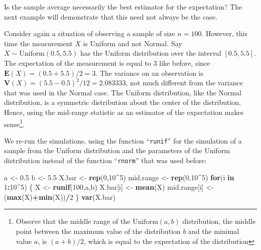 \documentclass[]{krantz}
\makeatletter
\newenvironment{Shaded}{\begin{snugshade}}{\end{snugshade}}
\newcommand{\ControlFlowTok}[1]{\textcolor[rgb]{0.13,0.29,0.53}{\textbf{#1}}}
\newcommand{\DecValTok}[1]{\textcolor[rgb]{0.00,0.00,0.81}{#1}}
\newcommand{\FloatTok}[1]{\textcolor[rgb]{0.00,0.00,0.81}{#1}}
\newcommand{\KeywordTok}[1]{\textcolor[rgb]{0.13,0.29,0.53}{\textbf{#1}}}
\newcommand{\NormalTok}[1]{#1}
\newcommand{\OperatorTok}[1]{\textcolor[rgb]{0.81,0.36,0.00}{\textbf{#1}}}
\newcommand{\StringTok}[1]{\textcolor[rgb]{0.31,0.60,0.02}{#1}}
\newcommand{\Expec}{\mathbf{E}}
\newcommand{\Var}{\mathbf{V}}
\newenvironment{kframe}{%
\medskip{}
\setlength{\fboxsep}{.8em}
 \def\at@end@of@kframe{}%
 \ifinner\ifhmode%
  \def\at@end@of@kframe{\end{minipage}}%
  \begin{minipage}{\columnwidth}%
 \fi\fi%
 \def\FrameCommand##1{\hskip\@totalleftmargin \hskip-\fboxsep
 \colorbox{shadecolor}{##1}\hskip-\fboxsep
     \hskip-\linewidth \hskip-\@totalleftmargin \hskip\columnwidth}%
 \MakeFramed {\advance\hsize-\width
   \@totalleftmargin\z@ \linewidth\hsize
   \@setminipage}}%
 {\par\unskip\endMakeFramed%
 \at@end@of@kframe}
\renewenvironment{Shaded}{\begin{kframe}}{\end{kframe}}
\theoremstyle{definition}
\theoremstyle{definition}
\theoremstyle{definition}
\theoremstyle{remark}
\makeatother
\begin{document}
Is the sample average necessarily the best estimator for the
expectation? The next example will demonstrate that this need not always
be the case.

Consider again a situation of observing a sample of size \(n=100\).
However, this time the measurement \(X\) is Uniform and not Normal. Say
\(X \sim \mathrm{Uniform}(0.5,5.5)\) has the Uniform distribution over the
interval \([0.5, 5.5]\). The expectation of the measurement is equal to 3
like before, since \(\Expec(X) = (0.5+5.5)/2 = 3\). The variance on an
observation is \(\Var(X) = (5.5 - 0.5)^2/12 = 2.083333\), not much
different from the variance that was used in the Normal case. The
Uniform distribution, like the Normal distribution, is a symmetric
distribution about the center of the distribution. Hence, using the
mid-range statistic as an estimator of the expectation makes sense\footnote{Observe that the middle range of the \(\mathrm{Uniform}(a,b)\)
  distribution, the middle point between the maximum value of the
  distribution \(b\) and the minimal value \(a\), is \((a+b)/2\), which is
  equal to the expectation of the distribution}.

We re-run the simulations, using the function ``\texttt{runif}'' for the
simulation of a sample from the Uniform distribution and the parameters
of the Uniform distribution instead of the function ``\texttt{rnorm}'' that was
used before:

\begin{Shaded}
\begin{Highlighting}[]
\NormalTok{a <-}\StringTok{ }\FloatTok{0.5}
\NormalTok{b <-}\StringTok{ }\FloatTok{5.5}
\NormalTok{X.bar <-}\StringTok{ }\KeywordTok{rep}\NormalTok{(}\DecValTok{0}\NormalTok{,}\DecValTok{10}\OperatorTok{^}\DecValTok{5}\NormalTok{)}
\NormalTok{mid.range <-}\StringTok{ }\KeywordTok{rep}\NormalTok{(}\DecValTok{0}\NormalTok{,}\DecValTok{10}\OperatorTok{^}\DecValTok{5}\NormalTok{)}
\ControlFlowTok{for}\NormalTok{(i }\ControlFlowTok{in} \DecValTok{1}\OperatorTok{:}\DecValTok{10}\OperatorTok{^}\DecValTok{5}\NormalTok{) \{}
\NormalTok{  X <-}\StringTok{ }\KeywordTok{runif}\NormalTok{(}\DecValTok{100}\NormalTok{,a,b)}
\NormalTok{  X.bar[i] <-}\StringTok{ }\KeywordTok{mean}\NormalTok{(X)}
\NormalTok{  mid.range[i] <-}\StringTok{ }\NormalTok{(}\KeywordTok{max}\NormalTok{(X)}\OperatorTok{+}\KeywordTok{min}\NormalTok{(X))}\OperatorTok{/}\DecValTok{2}
\NormalTok{\}}
\KeywordTok{var}\NormalTok{(X.bar)}
\end{Highlighting}
\end{Shaded}
\end{document}
